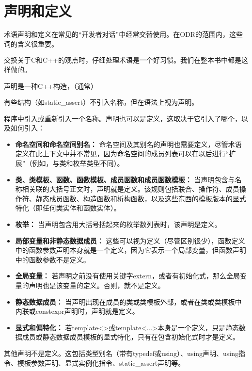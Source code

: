 \section{声明和定义}
术语声明和定义在常见的“开发者对话”中经常交替使用。在ODR的范围内，这些词的含义很重要。

\begin{notice}
交换关于C和C++的观点时，仔细处理术语是一个好习惯。我们在整本书中都是这样做的。
\end{notice}

声明是一种C++构造，（通常）

\begin{notice}
有些结构（如static\_assert）不引入名称，但在语法上视为声明。
\end{notice}

程序中引入或重新引入一个名称。声明也可以是定义，这取决于它引入了哪个，以及如何引入：

\begin{itemize}
\item 
\textbf{命名空间和命名空间别名：}
命名空间及其别名的声明也需要定义，尽管术语定义在此上下文中并不常见，因为命名空间的成员列表可以在以后进行“扩展”（例如，与类和枚举类型不同）。

\item 
\textbf{类、类模板、函数、函数模板、成员函数和成员函数模板： }
当声明包含与名称相关联的大括号正文时，声明就是定义。该规则包括联合、操作符、成员操作符、静态成员函数、构造函数和析构函数，以及这些东西的模板版本的显式特化（即任何类实体和函数实体）。

\item 
\textbf{枚举：}
当声明包含用大括号括起来的枚举数列表时，该声明是定义。

\item 
\textbf{局部变量和非静态数据成员：}
这些可以视为定义（尽管区别很少），函数定义中的函数参数声明本身就是一个定义，因为它表示一个局部变量，但函数声明中的函数参数不是定义。

\item 
\textbf{全局变量：}
若声明之前没有使用关键字extern，或者有初始化式，那么全局变量的声明也是该变量的定义。否则，就不是定义。

\item 
\textbf{静态数据成员： }
当声明出现在成员的类或类模板外部，或者在类或类模板中内联或constexpr声明时，声明就是定义。

\item 
\textbf{显式和偏特化：}
若template<>或template<...>本身是一个定义，只是静态数据成员或静态数据成员模板的显式特化，只有在包含初始化式时才是定义。

\end{itemize}

其他声明不是定义。这包括类型别名（带有typedef或using）、using声明、using指令、模板参数声明、显式实例化指令、static\_assert声明等。






